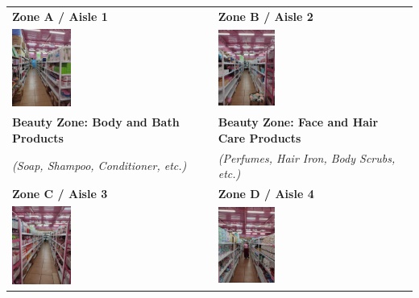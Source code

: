 \setlength{\LTleft}{0pt}
\setlength{\LTright}{0pt}
\begin{center}
	\begin{longtable}{|>{\centering\arraybackslash}m{}|>{\centering\arraybackslash}m{}|}
		\hline
		\textbf{Zone A / Aisle 1} & \textbf{Zone B / Aisle 2} \\
		\includegraphics[width=0.30\textwidth]{appendices/zone1} & \includegraphics[width=0.30\textwidth]{appendices/zone2} \\
		\textbf{Beauty Zone: Body and Bath Products} & \textbf{Beauty Zone: Face and Hair Care Products} \\
		\textit{(Soap, Shampoo, Conditioner, etc.)} & \textit{(Perfumes, Hair Iron, Body Scrubs, etc.)} \\
		\hline
		\textbf{Zone C / Aisle 3} & \textbf{Zone D / Aisle 4} \\
		\includegraphics[width=0.30\textwidth]{appendices/zone3} & \includegraphics[width=0.30\textwidth]{appendices/zone4} \\

\end{longtable}
\end{center}
